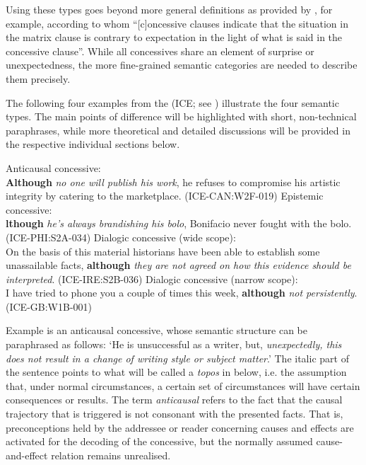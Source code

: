Using these types goes beyond more general definitions as provided by \citet[1098]{QuirkEtAl1985}, for example, according to whom “[c]oncessive clauses indicate that the situation in the matrix clause is contrary to expectation in the light of what is said in the concessive clause”. While all concessives share an element of surprise or unexpectedness, the more fine-grained semantic categories are needed to describe them precisely.

The following four examples from the \textit{} (ICE; see ) illustrate the four semantic types. The main points of difference will be highlighted with short, non-technical paraphrases, while more theoretical and detailed discussions will be provided in the respective individual sections below.

\ea\label{ex:8} Anticausal concessive:\label{bkm:Ref500312809}\\
  \textbf{Although} \textit{no one will publish his work}, he refuses to compromise his artistic integrity by catering to the marketplace. (ICE-CAN:W2F-019)
\ex\label{ex:9} Epistemic concessive:\label{bkm:Ref496793868}\\\relax
  [\textbf{A}]\textbf{lthough} \textit{he’s always brandishing his bolo}, Bonifacio never fought with the bolo. (ICE-PHI:S2A-034)
\ex\label{ex:10} Dialogic concessive (wide scope):\label{bkm:Ref496794740}\\
  On the basis of this material historians have been able to establish some unassailable facts, \textbf{although} \textit{they are not agreed on how this evidence should be interpreted}. (ICE-IRE:S2B-036)
\ex\label{ex:11} Dialogic concessive (narrow scope):\label{bkm:Ref496794746}\\
  I have tried to phone you a couple of times this week, \textbf{although} \textit{not persistently}. (ICE-GB:W1B-001)\\
\z

Example  is an anticausal concessive, whose semantic structure can be paraphrased as follows: ‘He is unsuccessful as a writer, but, \textit{unexpectedly, this does not result in a change of writing style or subject matter}.’ The italic part of the sentence points to what will be called a \textit{topos} in  below, i.e. the assumption that, under normal circumstances, a certain set of circumstances will have certain consequences or results. The term \textit{anticausal} refers to the fact that the causal trajectory that is triggered is not consonant with the presented facts. That is, preconceptions held by the addressee or reader concerning causes and effects are activated for the decoding of the concessive, but the normally assumed cause-and-effect relation remains unrealised.

